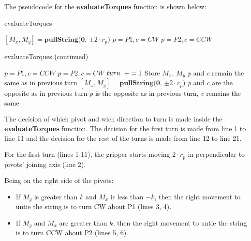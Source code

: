 The pseudocode for the \textbf{evaluateTorques} function is shown below:
\begin{algorithm}
	\caption{evaluateTorques}\label{euclid}
	\begin{algorithmic}[1]
		\State $[M_{x}, M_{y}] = \textbf{pullString(0, $\pm2 \cdot r_{p}$)}$
		\State $\textit{p} = \textit{P1}, \textit{c} = \textit{CW}$
		\State $\textit{p} = \textit{P2}, \textit{c} = \textit{CCW}$
	
	\end{algorithmic}
\end{algorithm}

\clearpage
		
\begin{algorithm}
	\caption{evaluateTorques (continued)}
	\begin{algorithmic}
		\State $\textit{p} = \textit{P1}, \textit{c} = \textit{CCW}$	
		\State $\textit{p} = \textit{P2}, \textit{c} = \textit{CW}$
		\EndIf
		\State $turn \hspace{0.2cm}+=1$
		\EndIf
		\State Store $M_{x}$, $M_{y}$
		\State \textit{p} and \textit{c} remain the same as in previous turn
		\Else
		\State $[M_{x}, M_{y}] = \textbf{pullString(0, $\pm2 \cdot r_{p}$)}$
		\State \textit{p} and \textit{c} are the opposite as in previous turn
		\Else
		\State \textit{p} is the opposite as in previous turn, \textit{c} remains the same
		\EndIf
		\EndIf
		\EndIf
	\end{algorithmic}
\end{algorithm}

The decision of which pivot and wich direction to turn is made inside the \textbf{evaluateTorques} function. The decision for the first turn is made from line 1 to line 11 and the decision for the rest of the turns is made from line 12 to line 21. 

For the first turn (lines 1-11), the gripper starts moving $2 \cdot r_{p}$ in perpendicular to pivots' joining axis (line 2).

Being on the right side of the pivots:
\begin{itemize}
	\item If $M_{y}$ is greater than $k$ and $M_{x}$ is less than $-k$, then the right movement to untie the string is to turn CW about P1 (lines 3, 4).
	\item If $M_{y}$ and $M_{x}$ are greater than $k$, then the right movement to untie the string is to turn CCW about P2 (lines 5, 6).
\end{itemize}

